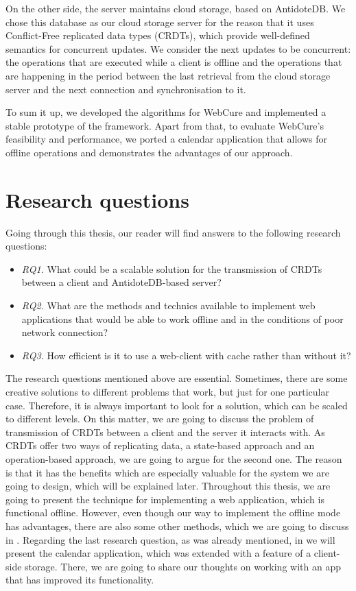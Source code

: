 On the other side, the server maintains cloud storage, based on AntidoteDB. We chose this database as our cloud storage server for the reason that it uses Conflict-Free replicated data types (CRDTs), which provide well-defined semantics for concurrent updates. We consider the next updates to be concurrent: the operations that are executed while a client is offline and the operations that are happening in the period between the last retrieval from the cloud storage server and the next connection and synchronisation to it. 

To sum it up, we developed the algorithms for WebCure and implemented a stable prototype of the framework. Apart from that, to evaluate WebCure's feasibility and performance, we ported a calendar application that allows for offline operations and demonstrates the advantages of our approach.

\section{Research questions}
\label{Introduction-Research}

Going through this thesis, our reader will find answers to the following research questions:

\begin{itemize}
    \item \textit{RQ1.} What could be a scalable solution for the transmission of CRDTs between a client and AntidoteDB-based server?
    \item \textit{RQ2.} What are the methods and technics available to implement web applications that would be able to work offline and
    in the conditions of poor network connection?
    \item \textit{RQ3.} How efficient is it to use a web-client with cache rather than without it?
  \end{itemize}

The research questions mentioned above are essential. Sometimes, there are some creative solutions to different problems that work, but just for one particular case. Therefore, it is always important to look for a solution, which can be scaled to different levels. On this matter, we are going to discuss the problem of transmission of CRDTs between a client and the server it interacts with. As CRDTs offer two ways of replicating data, a state-based approach and an operation-based approach, we are going to argue for the second one. The reason is that it has the benefits which are especially valuable for the system we are going to design, which will be explained later. Throughout this thesis, we are going to present the technique for implementing a web application, which is functional offline. However, even though our way to implement the offline mode has advantages, there are also some other methods, which we are going to discuss in . Regarding the last research question, as was already mentioned, in  we will present the calendar application, which was extended with a feature of a client-side storage. There, we are going to share our thoughts on working with an app that has improved its functionality.

